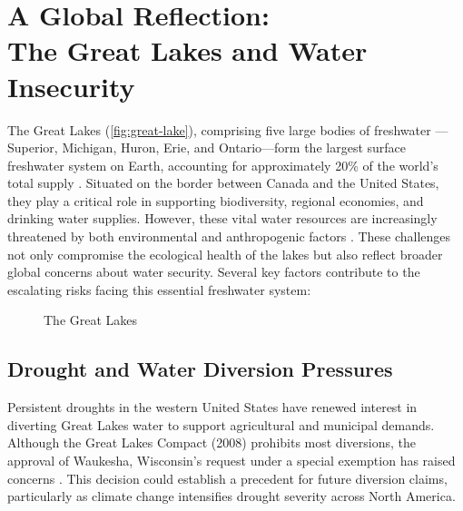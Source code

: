 

\chapter[A Global Reflection: The Great Lakes and Water Insecurity]{A Global Reflection:\\The Great Lakes and Water Insecurity}
\label{cp:global-reflection}

\vspace{.935em}

The Great Lakes (\autoref{fig:great-lake}), comprising five large bodies of freshwater — Superior, Michigan, Huron, Erie, and Ontario—form the largest surface freshwater system on Earth, accounting for approximately 20\% of the world's total supply \autocite{canada2025greatlakes}. Situated on the border between
Canada and the United States, they play a critical role in supporting biodiversity, regional economies, and drinking water supplies. However, these vital water resources are increasingly threatened by both environmental and anthropogenic factors \autocite{looby2022compact}. These challenges not only compromise the ecological health of the lakes but also reflect broader global concerns about water security. Several key factors contribute to the escalating risks facing this essential freshwater system: 

\begin{figure}[htpb]
    \centering
    \caption{The Great Lakes}
    \label{fig:great-lake}
\end{figure}

\section{Drought and Water Diversion Pressures}
Persistent droughts in the western United States have renewed interest in diverting Great Lakes water to support agricultural and municipal demands. Although the Great Lakes Compact (2008) prohibits most diversions, the approval of Waukesha, Wisconsin’s request under a special exemption has raised concerns \autocite{wisconsin2025waukesha}\autocite{walker2025mapping}. This decision could establish a precedent for future diversion claims, particularly as climate change intensifies drought severity across North America.

